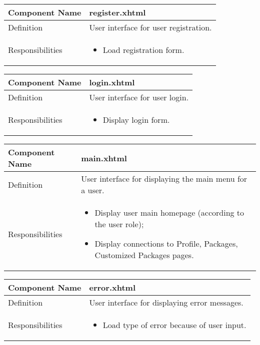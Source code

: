 \documentclass[a4paper,12pt]{book}
\begin{document}
\begin{center}
  \begin{tabular}{ | p{3.3cm} | p{11.7cm} | }
    \hline
    Component Name & \textbf{register.xhtml} \\ \hline
    Definition & User interface for user registration. \\ \hline
    Responsibilities & \parbox{0.65\textwidth}{
      \begin{itemize}[noitemsep,leftmargin=*]
        \item Load registration form.
       \end{itemize}} \\ \hline
  \end{tabular}
\end{center}
\begin{center}
  \begin{tabular}{ | p{3.3cm} | p{11.7cm} | }
    \hline
    Component Name & \textbf{login.xhtml} \\ \hline
    Definition & User interface for user login. \\ \hline
    Responsibilities & \parbox{0.65\textwidth}{
      \begin{itemize}[noitemsep,leftmargin=*]
        \item Display login form.
       \end{itemize}} \\ \hline
  \end{tabular}
\end{center}
\begin{center}
  \begin{tabular}{ | p{3.3cm} | p{11.7cm} | }
    \hline
    Component Name & \textbf{main.xhtml} \\ \hline
    Definition & User interface for displaying the main menu for a user. \\ \hline
    Responsibilities & \parbox{0.65\textwidth}{
      \begin{itemize}[noitemsep,leftmargin=*]
        \item Display user main homepage (according to the user role);
        \item Display connections to Profile, Packages, Customized Packages pages.
      \end{itemize}} \\ \hline
  \end{tabular}
\end{center}
\begin{center}
  \begin{tabular}{ | p{3.3cm} | p{11.7cm} | }
    \hline
    Component Name & \textbf{error.xhtml} \\ \hline
    Definition & User interface for displaying error messages. \\ \hline
    Responsibilities & \parbox{0.65\textwidth}{
      \begin{itemize}[noitemsep,leftmargin=*]
        \item Load type of error because of user input.
      \end{itemize}} \\ \hline
    \end{tabular}
  \end{center}
\end{document}
